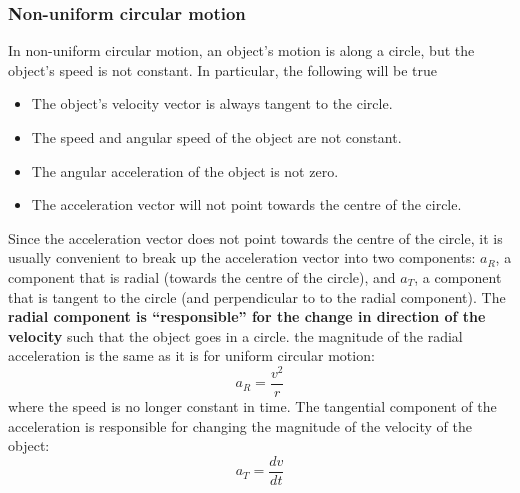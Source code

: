 \subsubsection{Non-uniform circular motion}

In non-uniform circular motion, an object's motion is along a circle, but the object's speed is not constant. In particular, the following will be true

\begin{itemize}
\item The object's velocity vector is always tangent to the circle.
\item The speed and angular speed of the object are not constant.
\item The angular acceleration of the object is not zero.
\item The acceleration vector will not point towards the centre of the circle.
\end{itemize}

Since the acceleration vector does not point towards the centre of the circle, it is usually convenient to break up the acceleration vector into two components: $a_R$, a component that is radial (towards the centre of the circle), and $a_T$, a component that is tangent to the circle (and perpendicular to to the radial component). The \textbf{radial component is ``responsible'' for the change in direction of the velocity} such that the object goes in a circle. the magnitude of the radial acceleration is the same as it is for uniform circular motion:
\begin{equation}
a_R=\frac{v^2}{r}
\end{equation}
where the speed is no longer constant in time. The tangential component of the acceleration is responsible for changing the magnitude of the velocity of the object:
\begin{equation}
a_T = \frac{dv}{dt}
\end{equation}


